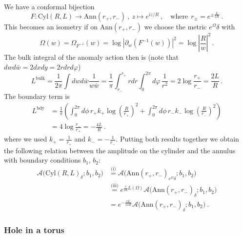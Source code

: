 \documentclass[11pt,a4paper]{article}
\numberwithin{equation}{section}
\begin{document}
We have a conformal bijection
\begin{equation}
    F : \mathrm{Cyl}(R,L) \longrightarrow \mathrm{Ann}(r_+,r_-) ~,~ z \mapsto e^{i z /R} 
    ~ ,
    \quad \text{where} ~~ r_\pm= e^{\pm \frac{ L}{2R}} \ .
\end{equation}
This becomes an isometry if on $\mathrm{Ann}(r_+,r_-)$ we choose the metric $e^{\Omega}\delta$ with
%
\begin{equation}
    \Omega(w) = \Omega_{F^{-1}}(w) = \log \left|\partial_w (F^{-1}(w))\right|^2 = \log \left|\frac{R}{w}\right|^2\,.
\end{equation}
The bulk integral of the anomaly action then is (note that $dw d\bar w = 2 dxdy = 2 r dr d\varphi$)
%
\begin{equation}\label{eq:ann-Lbulk}
    L^\text{bulk}  = \frac{1}{2\pi}\int dw d\bar{w} \frac{1}{w\bar{w}}  
    = \frac{1}{\pi} \int_{r_-}^{r_+} r dr \int_{0}^{2\pi} d\varphi\, \frac{1}{r^2} 
     = 2 \log \frac{r_+}{r_-} = \frac{2L}{R}\,.
\end{equation}
The boundary term is
%
\begin{align}\label{eq:ann-Lbnd}
    L^\text{bdy} &=\frac{1}{\pi}\left( \int_{0}^{2\pi} d\phi\,  r_+ k_+ \log \left(\frac{R}{r_+}\right)^2 + \int_{0}^{2\pi} d\phi\,  r_- k_- \log \left(\frac{R}{r_-}\right)^2 \right)
    \nonumber
    \\
    &= 4 \log \frac{r_-}{r_+} = - \frac{4L}{R} \ .
\end{align}
%
where we used $k_+ =  \tfrac{1}{r_+}$ and $k_- = -\tfrac{1}{r_-}$. Putting both results together we obtain the following relation between the amplitude on the cylinder and the annulus with boundary conditions $b_1$, $b_2$:
%
\begin{align}\label{eq:cylinder-to-annulus}
    \mathcal{A}\big(\mathrm{Cyl}(R,L)_\delta;b_1,b_2\big) 
    &\overset{\text{(i)}}= 
    \mathcal{A}\big(\mathrm{Ann}(r_+,r_-)_{e^{\Omega}\delta};b_1,b_2\big) 
        \nonumber
    \\
    &\overset{\text{(iii)}}=
    e^{\frac{c}{24}L(\Omega)}\mathcal{A}\big(\mathrm{Ann}(r_+,r_-)_\delta;b_1,b_2\big) 
    \nonumber
    \\
    &= e^{-\frac{c L}{12 R}} \mathcal{A}\big(\mathrm{Ann}(r_+,r_-)_\delta;b_1,b_2\big)\ .
\end{align}


\subsubsection{Hole in a torus}\label{sec:MoebiusUDLD}
\end{document}
